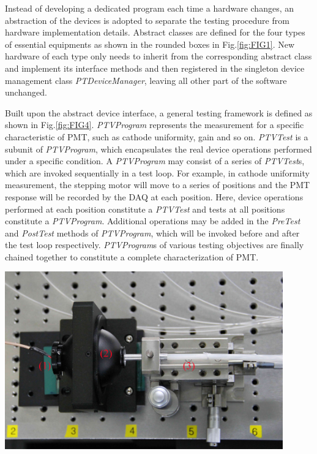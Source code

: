 \documentclass[a4paper,10pt,twoside]{cpc-hepnp}
\begin{document}
\begin{CJK*}{UTF8}{gbsn}
\begin{multicols}{2}
Instead of developing a dedicated program each time a hardware changes, an abstraction of the devices is adopted to separate the testing procedure from hardware implementation details. 
Abstract classes are defined for the four types of essential equipments as shown in the rounded boxes in Fig.\ref{fig:FIG1}.
New hardware of each type only needs to inherit from the corresponding abstract class and implement its interface methods and then registered in the singleton device management class \textit{PTDeviceManager}, leaving all other part of the software unchanged.
	
Built upon the abstract device interface, a general testing framework is defined as shown in Fig.\ref{fig:FIG4}.
\textit{PTVProgram} represents the measurement for a specific characteristic of PMT, such as cathode uniformity, gain and so on.
\textit{PTVTest} is a subunit of \textit{PTVProgram}, which encapsulates the real device operations performed under a specific condition.
A \textit{PTVProgram} may consist of a series of \textit{PTVTest}s, which are invoked sequentially in a test loop.
For example, in cathode uniformity measurement, the stepping motor will move to a series of positions and the PMT response will be recorded by the DAQ at each position.
Here, device operations performed at each position constitute a \textit{PTVTest} and tests at all positions constitute a \textit{PTVProgram}.
Additional operations may be added in the \textit{PreTest} and \textit{PostTest} methods of \textit{PTVProgram}, which will be invoked before and after the test loop respectively.
\textit{PTVProgram}s of various testing objectives are finally chained together to constitute a complete characterization of PMT.

\end{multicols}
\begin{center}
	\includegraphics[width=120mm]{FIG4}
\end{center}
\begin{multicols}{2}
	

\end{multicols}
\end{CJK*}
\end{document}

